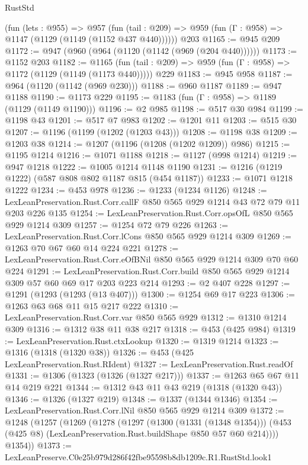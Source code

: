 \begin{lexlean}{RustStd}
\begin{coremodule}
    (fun (lets : @955) =>
    @957 (fun (tail : @209) => @959 (fun (Γ : @958) => @1147 (@1129 (@1149 (@1152 @437 @440))))))
    @203
@1165 := @945 @209
@1172 := @947 (@960 (@964 (@1120 (@1142 (@969 (@204 @440))))))
@1173 := @1152 @203
@1182 := @1165
    (fun (tail : @209) => @959 (fun (Γ : @958) => @1172 (@1129 (@1149 (@1173 @440)))))
    @229
@1183 := @945 @958
@1187 := @964 (@1120 (@1142 (@969 @230)))
@1188 := @960 @1187
@1189 := @947 @1188
@1190 := @1173 @229
@1195 := @1183 (fun (Γ : @958) => @1189 (@1129 (@1149 @1190)))
@1196 := @2 @985
@1198 := @517 @30 @984
@1199 := @1198 @43
@1201 := @517 @7 @983
@1202 := @1201 @11
@1203 := @515 @30
@1207 := @1196 (@1199 (@1202 (@1203 @43)))
@1208 := @1198 @38
@1209 := @1203 @38
@1214 := @1207 (@1196 (@1208 (@1202 @1209)) @986)
@1215 := @1195 @1214
@1216 := @1071 @1188
@1218 := @1127 (@998 @1214)
@1219 := @947 @1218
@1222 := @1005 @1214 @1148 @1190
@1231 := @1216 (@1219 @1222) (@587 @808 @802 @1187 @815 (@454 @1187))
@1233 := @1071 @1218 @1222
@1234 := @453 @978
@1236 := @1233 (@1234 @1126)
@1248 := LexLeanPreservation.Rust.Corr.callF @850 @565 @929 @1214 @43 @72 @79 @11 @203 @226 @135
@1254 := LexLeanPreservation.Rust.Corr.opsOfL @850 @565 @929 @1214 @309
@1257 := @1254 @72 @79 @226
@1263 := LexLeanPreservation.Rust.Corr.lCons @850 @565 @929 @1214 @309
@1269 := @1263 @70 @67 @60 @14 @224 @221
@1278 := LexLeanPreservation.Rust.Corr.eOfBNil @850 @565 @929 @1214 @309 @70 @60 @224
@1291 := LexLeanPreservation.Rust.Corr.build
    @850
    @565
    @929
    @1214
    @309
    @57
    @60
    @69
    @17
    @203
    @223
    @214
@1293 := @2 @407 @228
@1297 := @1291 (@1293 (@1293 (@13 @407)))
@1300 := @1254 @69 @17 @223
@1306 := @1263 @63 @68 @11 @15 @217 @222
@1310 := LexLeanPreservation.Rust.Corr.var @850 @565 @929
@1312 := @1310 @1214 @309
@1316 := @1312 @38 @11 @38 @217
@1318 := @453 (@425 @984)
@1319 := LexLeanPreservation.Rust.ctxLookup
@1320 := @1319 @1214
@1323 := @1316 (@1318 (@1320 @38))
@1326 := @453 (@425 LexLeanPreservation.Rust.RIdent)
@1327 := LexLeanPreservation.Rust.readOf
@1331 := @1306 (@1323 (@1326 (@1327 @217)))
@1337 := @1263 @65 @67 @11 @14 @219 @221
@1344 := @1312 @43 @11 @43 @219 (@1318 (@1320 @43))
@1346 := @1326 (@1327 @219)
@1348 := @1337 (@1344 @1346)
@1354 := LexLeanPreservation.Rust.Corr.lNil @850 @565 @929 @1214 @309
@1372 := @1248
    (@1257
      (@1269
        (@1278
          (@1297
            (@1300 (@1331 (@1348 @1354)))
            (@453 (@425 @8) (LexLeanPreservation.Rust.buildShape @850 @57 @60 @214))))
        @1354))
@1373 := LexLeanPreserve.C0e25b979d286f42fbe95598b8db1209c.R1.RustStd.look1

\end{coremodule}
\end{lexlean}
